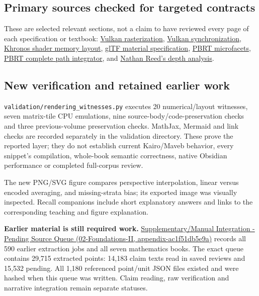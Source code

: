 \subsection{Primary sources checked for targeted contracts}\label{appendix-3b67654799a2-primary-sources-checked-for-targeted-contracts}

These are selected relevant sections, not a claim to have reviewed every page of each specification or textbook: \href{https://docs.vulkan.org/spec/latest/chapters/primsrast.html}{Vulkan rasterization}, \href{https://docs.vulkan.org/spec/latest/chapters/synchronization.html}{Vulkan synchronization}, \href{https://docs.vulkan.org/guide/latest/shader_memory_layout.html}{Khronos shader memory layout}, \href{https://raw.githubusercontent.com/KhronosGroup/glTF/main/specification/2.0/Specification.adoc}{glTF material specification}, \href{https://pbr-book.org/4ed/Reflection_Models/Roughness_Using_Microfacet_Theory}{PBRT microfacets}, \href{https://pbr-book.org/4ed/Light_Transport_I_Surface_Reflection/A_Better_Path_Tracer}{PBRT complete path integrator}, and \href{https://developer.nvidia.com/blog/visualizing-depth-precision/}{Nathan Reed's depth analysis}.

\subsection{New verification and retained earlier work}\label{appendix-3b67654799a2-new-verification-and-retained-earlier-work}

\texttt{validation/rendering\_witnesses.py} executes 20 numerical/layout witnesses, seven matrix-tile CPU emulations, nine source-body/code-preservation checks and three previous-volume preservation checks. MathJax, Mermaid and link checks are recorded separately in the validation directory. These prove the reported layer; they do not establish current Kairo/Maveb behavior, every snippet's compilation, whole-book semantic correctness, native Obsidian performance or completed full-corpus review.

The new PNG/SVG figure compares perspective interpolation, linear versus encoded averaging, and missing-strata bias; its exported image was visually inspected. Recall companions include short explanatory answers and links to the corresponding teaching and figure explanation.

\textbf{Earlier material is still required work.} \href{../02-Foundations-II/main.pdf\#nameddest=appendix-ac1f51db5e9a}{Supplementary/Manual Integration - Pending Source Queue (02-Foundations-II, appendix-ac1f51db5e9a)} records all 590 earlier extraction jobs and all seven mathematics books. The exact queue contains 29,715 extracted points: 14,183 claim texts read in saved reviews and 15,532 pending. All 1,180 referenced point/unit JSON files existed and were hashed when this queue was written. Claim reading, raw verification and narrative integration remain separate statuses.

